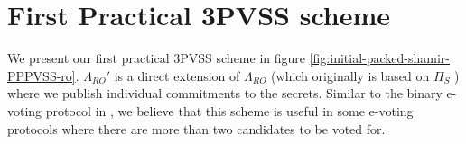 % 

\section{First Practical 3PVSS scheme}
\label{sec:practical-3PVSS}
We present our first practical 3PVSS scheme in figure \ref{fig:initial-packed-shamir-PPPVSS-ro}. $\Lambda_{RO}'$ is a 
direct extension of $\Lambda_{RO}$ \cite{cryptoeprint:2025/576} 
(which originally is based on $\Pi_S$ \cite{cryptoeprint:2023/1669}) where we publish 
individual commitments to the secrets. Similar to the binary e-voting protocol in 
\cite{cryptoeprint:2025/576}, we believe that this scheme is useful in some 
e-voting protocols where there are more than two candidates to be voted for.

% 

% 

